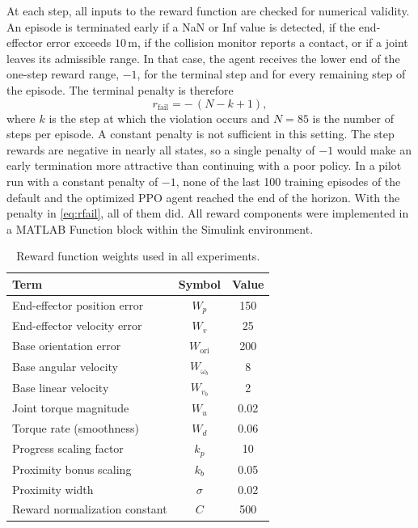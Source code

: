 \documentclass{ieeeaccess}
\begin{document}
At each step, all inputs to the reward function are checked for numerical validity. An
episode is terminated early if a NaN or Inf value is detected, if the end-effector error exceeds
$10\,\mathrm{m}$, if the collision monitor reports a contact, or if a joint leaves its admissible range.
In that case, the agent receives the lower end of the one-step reward range, $-1$, for the terminal
step and for every remaining step of the episode. The terminal penalty is therefore
\begin{equation}
r_{\mathrm{fail}} = -\,(N - k + 1),
\label{eq:rfail}
\end{equation}
where $k$ is the step at which the violation occurs and $N = 85$ is the number of steps
per episode. A constant penalty is not sufficient in this setting. The step rewards are negative in
nearly all states, so a single penalty of $-1$ would make an early termination more attractive than
continuing with a poor policy. In a pilot run with a constant penalty of $-1$, none of the
last 100 training episodes of the default and the optimized PPO agent reached the end of the horizon.
With the penalty in \eqref{eq:rfail}, all of them did. All reward components were implemented in
a MATLAB Function block within the Simulink environment.

\begin{table}[!b]
\centering
\caption{Reward function weights used in all experiments.}
\label{tab:reward_weights}
\begin{tabular}{lcc}
\toprule
\textbf{Term} & \textbf{Symbol} & \textbf{Value} \\
\midrule
End-effector position error      & $W_p$              & 150   \\
End-effector velocity error      & $W_v$              & 25    \\
Base orientation error           & $W_{\mathrm{ori}}$   & 200   \\
Base angular velocity            & $W_{\omega_b}$     & 8     \\
Base linear velocity             & $W_{v_b}$          & 2     \\
Joint torque magnitude           & $W_u$              & 0.02  \\
Torque rate (smoothness)         & $W_d$              & 0.06  \\
Progress scaling factor          & $k_p$              & 10    \\
Proximity bonus scaling          & $k_b$              & 0.05  \\
Proximity width                  & $\sigma$           & 0.02  \\
Reward normalization constant    & $C$                & 500   \\
\bottomrule
\end{tabular}
\end{table}
\end{document}
